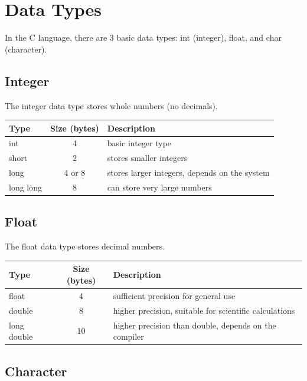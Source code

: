 \section{Data Types}

In the C language, there are 3 basic data types: int (integer), float, and char (character).

\subsection{Integer}

The integer data type stores whole numbers (no decimals).\\
\begin{center}
	\begin{tabular}{|l|c|l|}
		\hline
		\textbf{Type} & \textbf{Size (bytes)} & \textbf{Description} \\ \hline
		int 		& 4 		& basic integer type \\ \hline
		short 		& 2 		& stores smaller integers \\ \hline
		long 		& 4 or 8 	& stores larger integers, depends on the system \\ \hline
		long long 	& 8 		& can store very large numbers \\ \hline
	\end{tabular}
\end{center}

\subsection{Float}

The float data type stores decimal numbers.
\begin{center}
	\begin{tabular}{|l|c|l|}
		\hline
		\textbf{Type} & \textbf{Size (bytes)} & \textbf{Description} \\ \hline
		float 		& 4 	& sufficient precision for general use \\ \hline
		double 		& 8 	& higher precision, suitable for scientific calculations \\ \hline
		long double	& 10 	& higher precision than double, depends on the compiler \\ \hline
	\end{tabular}
\end{center}

\subsection{Character}

